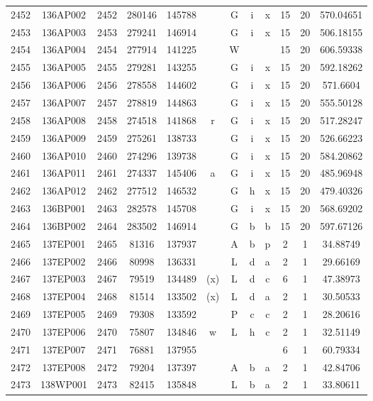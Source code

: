 \begin{tabular}{|*{12}{c|}}
2452 & 136AP002 & 2452 & 280146 & 145788 &  & G & i & x & 15 & 20 & 570.04651 \\ 
2453 & 136AP003 & 2453 & 279241 & 146914 &  & G & i & x & 15 & 20 & 506.18155 \\ 
2454 & 136AP004 & 2454 & 277914 & 141225 &  & W &  &  & 15 & 20 & 606.59338 \\ 
2455 & 136AP005 & 2455 & 279281 & 143255 &  & G & i & x & 15 & 20 & 592.18262 \\ 
2456 & 136AP006 & 2456 & 278558 & 144602 &  & G & i & x & 15 & 20 & 571.6604 \\ 
2457 & 136AP007 & 2457 & 278819 & 144863 &  & G & i & x & 15 & 20 & 555.50128 \\ 
2458 & 136AP008 & 2458 & 274518 & 141868 & r & G & i & x & 15 & 20 & 517.28247 \\ 
2459 & 136AP009 & 2459 & 275261 & 138733 &  & G & i & x & 15 & 20 & 526.66223 \\ 
2460 & 136AP010 & 2460 & 274296 & 139738 &  & G & i & x & 15 & 20 & 584.20862 \\ 
2461 & 136AP011 & 2461 & 274337 & 145406 & a & G & i & x & 15 & 20 & 485.96948 \\ 
2462 & 136AP012 & 2462 & 277512 & 146532 &  & G & h & x & 15 & 20 & 479.40326 \\ 
2463 & 136BP001 & 2463 & 282578 & 145708 &  & G & i & x & 15 & 20 & 568.69202 \\ 
2464 & 136BP002 & 2464 & 283502 & 146914 &  & G & b & b & 15 & 20 & 597.67126 \\ 
2465 & 137EP001 & 2465 & 81316 & 137937 &  & A & b & p & 2 & 1 & 34.88749 \\ 
2466 & 137EP002 & 2466 & 80998 & 136331 &  & L & d & a & 2 & 1 & 29.66169 \\ 
2467 & 137EP003 & 2467 & 79519 & 134489 & (x) & L & d & c & 6 & 1 & 47.38973 \\ 
2468 & 137EP004 & 2468 & 81514 & 133502 & (x) & L & d & a & 2 & 1 & 30.50533 \\ 
2469 & 137EP005 & 2469 & 79308 & 133592 &  & P & c & c & 2 & 1 & 28.20616 \\ 
2470 & 137EP006 & 2470 & 75807 & 134846 & w & L & h & c & 2 & 1 & 32.51149 \\ 
2471 & 137EP007 & 2471 & 76881 & 137955 &  &  &  &  & 6 & 1 & 60.79334 \\ 
2472 & 137EP008 & 2472 & 79204 & 137397 &  & A & b & a & 2 & 1 & 42.84706 \\ 
2473 & 138WP001 & 2473 & 82415 & 135848 &  & L & b & a & 2 & 1 & 33.80611 \\ 

\end{tabular}
